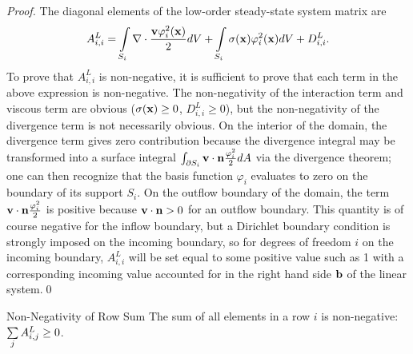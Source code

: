 \begin{proof}
The diagonal elements  of the low-order steady-state system matrix are
\[
A^L_{i,i} = \int\limits_{S_{i}}\nabla\cdot
   \frac{\mathbf{v}\varphi_i^2(\mathbf{x})}{2} dV
      + \int\limits_{S_{i}}\sigma(\mathbf{x})\varphi_i^2(\mathbf{x})dV
      + D_{i,i}^L.
\]
To prove that $A^L_{i,i}$ is non-negative, it is sufficient to prove that
each term in the above expression is non-negative. The non-negativity of
the interaction term and viscous term are obvious ($\sigma(\mathbf{x}) \ge 0$,
$D_{i,i}^L\geq 0$), but
the non-negativity of the divergence term is not necessarily obvious. On the interior of
the domain, the divergence term gives zero contribution because the divergence integral may
be transformed into a surface integral $\int_{\partial S_{i}}
\mathbf{v}\cdot\mathbf{n}\frac{\varphi_i^2}{2} dA$
via the divergence theorem; one can then recognize that
the basis function $\varphi_i$ evaluates to zero on the boundary of its support $S_{i}$.
On the outflow boundary of the domain, the term $\mathbf{v}\cdot\mathbf{n}
\frac{\varphi_i^2}{2}$ is positive because $\mathbf{v}\cdot\mathbf{n} >0$
for an outflow boundary. This quantity is of course negative for the inflow boundary,
but a Dirichlet boundary condition is strongly imposed on the incoming boundary, so
for degrees of freedom $i$ on the incoming boundary, $A^L_{i,i}$ will be set equal
to some positive value such as 1 with a corresponding incoming value
accounted for in the right hand side $\mathbf{b}$ of the linear system.\qed
\end{proof}
\begin{lemma}{Non-Negativity of Row Sum}{}
   The sum of all elements in a row $i$ is non-negative: $\sum\limits_j A^L_{i,j} \ge 0$.
\end{lemma}


